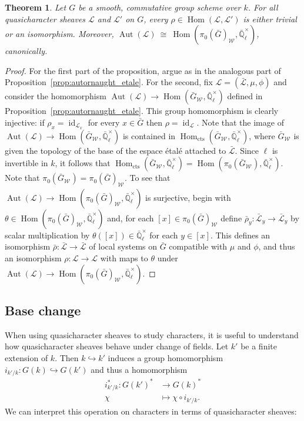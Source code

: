 \documentclass{amsart}
\theoremstyle{plain}
\newtheorem{theorem}{Theorem}[section]
\theoremstyle{definition}
\theoremstyle{remark}
\newcommand{\EE}{\mathbb{\bar Q}_\ell}
\newcommand{\Fq}{k}
\newcommand{\EEx}{\EE^\times}
\newcommand{\Weil}[1]{\mathcal{W}_{#1}}
\DeclareMathOperator{\Aut}{Aut}
\DeclareMathOperator{\Hom}{Hom}
\DeclareMathOperator{\id}{id}
\newcommand{\iso}{{\ \cong\ }}
\newcommand{\qcs}[1]{{\mathcal{#1}}}
\newcommand{\gqcs}[1]{{\mathcal{\bar #1}}}
\newcommand{\bG}{\bar{G}}
\begin{document}
\begin{theorem}\label{thm:autornaught}
Let $G$ be a smooth, commutative group scheme over $\Fq$.
For all quasicharacter sheaves $\qcs{L}$ and $\qcs{L}'$ on $G$,
every $\rho \in \Hom(\qcs{L},\qcs{L}')$ is either trivial or an isomorphism.
Moreover, $\Aut(\qcs{L}) \iso \Hom(\pi_0(\bG)_{\Weil{}},\EEx)$, canonically.
\end{theorem}
\begin{proof} 
For the first part of the proposition, argue as in the analogous part of Proposition~\ref{prop:autornaught_etale}.
For the second, fix $\qcs{L} = (\gqcs{L},\mu,\phi)$ and consider the homomorphism $\Aut(\qcs{L}) \to \Hom(\bG_{\Weil{}},\EEx)$ defined in Proposition~\ref{prop:autornaught_etale}.
This group homomorphism is clearly injective: if $\rho_x = \id_{\qcs{L}_x}$ for every $x\in \bG$ then $\rho = \id_{\qcs{L}}$.
Note that the image of $\Aut(\qcs{L}) \to \Hom(\bG_{\Weil{}},\EEx)$ is contained in $\Hom_\text{cts}(\bG_{\Weil{}},\EEx)$, where $\bG_{\Weil{}}$ is given the topology of the base of the espace étalé attached to $\gqcs{L}$.
Since $\ell$ is invertible in $\Fq$, it follows that $\Hom_\text{cts}(\bG_{\Weil{}},\EEx) = \Hom(\pi_0(\bG_{\Weil{}}),\EEx)$. 
Note that $\pi_0(\bG_{\Weil{}})=\pi_0(\bG)_{\Weil{}}$. 
To see that $\Aut(\qcs{L}) \to \Hom(\pi_0(\bG)_{\Weil{}},\EEx)$ is surjective, begin with $\theta\in\Hom(\pi_0(\bG)_{\Weil{}},\EEx)$ and, for each $[x] \in \pi_0(\bG)_{\Weil{}}$ define $\bar\rho_y: \gqcs{L}_y \to \gqcs{L}_y$ by scalar multiplication by $\theta([x])\in \EEx$ for each $y\in [x]$.
This defines an isomorphism $\bar\rho : \gqcs{L}\to \gqcs{L}$ of local systems on $\bG$ compatible with $\mu$ and $\phi$, and thus an isomorphism $\rho :\qcs{L}\to \qcs{L}$ with maps to $\theta$ under $\Aut(\qcs{L}) \to \Hom(\pi_0(\bG)_{\Weil{}},\EEx)$.
\end{proof}





\subsection{Base change}\label{sec:basechange}

When using quasicharacter sheaves to study characters, it is useful to understand
how quasicharacter sheaves behave under change of fields.
Let $k'$ be a finite extension of $k$. Then $k \hookrightarrow k'$ induces a group homomorphism
$i_{k'/k} : G(k) \hookrightarrow G(k')$ and thus a homomorphism
\begin{align*}
i_{k'/k}^* : G(k')^* &\to G(k)^* \\
\chi &\mapsto \chi\circ i_{k'/k}.
\end{align*}
We can interpret this operation on characters in terms of quasicharacter sheaves:
\end{document}
